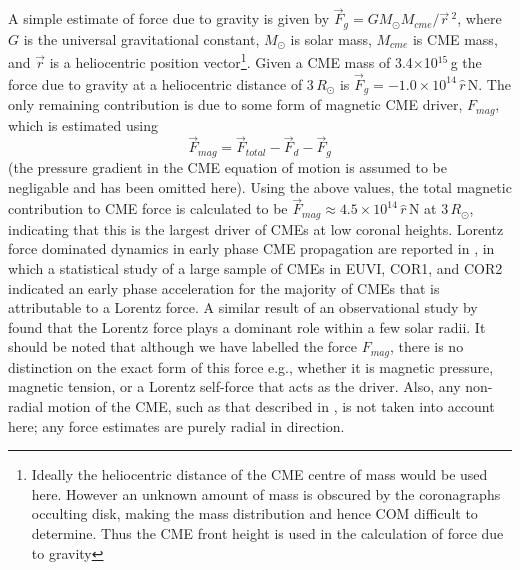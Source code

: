 A simple estimate of force due to gravity is given by $\vec{F}_{g}=GM_{\odot}M_{cme}/\vec{r}\,^2$, where $G$ is the universal gravitational 
constant, $M_{\odot}$ is solar mass, $M_{cme}$ is CME mass, and $\vec{r}$ is a heliocentric position vector\footnote{Ideally the heliocentric 
distance of the CME centre of mass would be used here. However an unknown amount of mass is obscured by the coronagraphs occulting disk, 
making the mass distribution and hence COM difficult to determine. Thus the CME front height is used in the calculation of force due to gravity}. 
Given a CME mass of 3.4$\times$10$^{15}$\,g the force due to gravity at a heliocentric distance of 3\,$R_{\odot}$ is $\vec{F}_{g}=-1.0\times10^
{14}\,\hat{r}$\,N. The only remaining contribution is due to some form of magnetic CME driver, $F_{mag}$, which is estimated using 
\begin{equation}
\vec{F}_{mag}= \vec{F}_{total}-\vec{F}_{d}-\vec{F}_{g}
\end{equation}
(the pressure gradient in the CME equation of motion is assumed to be negligable and has been omitted here). Using the above values, the total 
magnetic contribution to CME force is calculated to be $\vec{F}_{mag}\approx4.5\times10^{14}\,\hat{r}$\,N at 3\,$R_{\odot}$, indicating that this is 
the largest driver of CMEs at low coronal heights. Lorentz force dominated dynamics in early phase CME propagation are reported in \citet
{bein2011}, in which a statistical study of a large sample of CMEs in EUVI, COR1, and COR2 indicated an early phase acceleration for the majority 
of CMEs that is attributable to a Lorentz force.  A similar result of an observational study by \citet{vrs06} found that the Lorentz force plays a 
dominant role within a few solar radii. It should be noted that although we have labelled the force $F_{mag}$, there is no distinction on the exact 
form of this force e.g., whether it is magnetic pressure, magnetic tension, or a Lorentz self-force that acts as the driver. Also, any non-radial motion 
of the CME, such as that described in \citet{byr10}, is not taken into account here; any force estimates are purely 
radial in direction.


